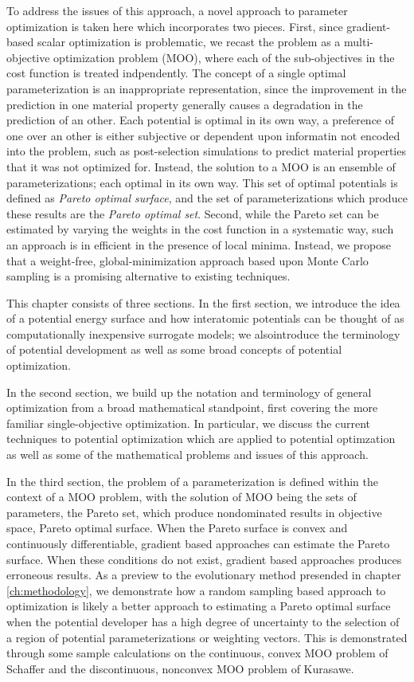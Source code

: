 To address the issues of this approach, a novel approach to parameter optimization is taken here which incorporates two pieces.  First, since gradient-based scalar optimization is problematic, we recast the problem as a multi-objective optimization problem (MOO), where each of the sub-objectives in the cost function is treated indpendently.  The concept of a single optimal parameterization is an inappropriate representation, since the improvement in the prediction in one material property generally causes a degradation in the prediction of an other.  Each potential is optimal in its own way, a preference of one over an other is either subjective or dependent upon informatin not encoded into the problem, such as post-selection simulations to predict material properties that it was not optimized for.  Instead, the solution to a MOO is an ensemble of parameterizations; each optimal in its own way.  This set of optimal potentials is defined as \emph{Pareto optimal surface}, and the set of parameterizations which produce these results are the \emph{Pareto optimal set}.  Second, while the Pareto set can be estimated by varying the weights in the cost function in a systematic way, such an approach is in efficient in the presence of local minima.  Instead, we propose that a weight-free, global-minimization approach based upon Monte Carlo sampling is a promising alternative to existing techniques.

This chapter consists of three sections.  In the first section, we introduce the idea of a potential energy surface and how interatomic potentials can be thought of as computationally inexpensive surrogate models; we alsointroduce the terminology of potential development as well as some broad concepts of potential optimization.

In the second section, we build up the notation and terminology of general optimization from a broad mathematical standpoint, first covering the more familiar single-objective optimization.  In particular, we discuss the current techniques to potential optimization which are applied to potential optimzation as well as some of the mathematical problems and issues of this approach.

In the third section, the problem of a parameterization is defined within the context of a MOO problem, with the solution of MOO being the sets of parameters, the Pareto set, which produce nondominated results in objective space, Pareto optimal surface.  When the Pareto surface is convex and continuously differentiable, gradient based approaches can estimate the Pareto surface.  When these conditions do not exist, gradient based approaches produces erroneous results.  As a preview to the evolutionary method presended in chapter \ref{ch:methodology}, we demonstrate how a random sampling based approach to optimization is likely a better approach to estimating a Pareto optimal surface when the potential developer has a high degree of uncertainty to the selection of a region of potential parameterizations or weighting vectors.  This is demonstrated through some sample calculations on the continuous, convex MOO  problem of Schaffer\cite{schaffer1984_pareto} and the discontinuous, nonconvex MOO problem of Kurasawe\cite{kursawe1991_pareto}.

